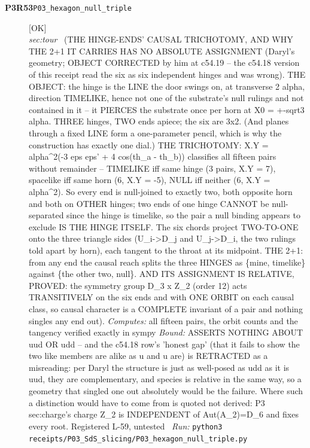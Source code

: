 \begin{description}
\item[\textbf{P3R53}\quad\texttt{P03\_hexagon\_null\_triple}]\hfill\textsf{[OK]}\\
\textit{sec:tour} \ (THE HINGE-ENDS' CAUSAL TRICHOTOMY, AND WHY THE 2+1 IT CARRIES HAS NO ABSOLUTE ASSIGNMENT (Daryl's geometry; OBJECT CORRECTED by him at c54.19 -- the c54.18 version of this receipt read the six as six independent hinges and was wrong). THE OBJECT: the hinge is the LINE the door swings on, at transverse 2 alpha, direction TIMELIKE, hence not one of the substrate's null rulings and not contained in it -- it PIERCES the substrate once per horn at X0 = +-sqrt3 alpha. THREE hinges, TWO ends apiece; the six are 3x2. (And planes through a fixed LINE form a one-parameter pencil, which is why the construction has exactly one dial.) THE TRICHOTOMY: X.Y = alpha\textasciicircum{}2(-3 eps eps' + 4 cos(th\_a - th\_b)) classifies all fifteen pairs without remainder -- TIMELIKE iff same hinge (3 pairs, X.Y = 7), spacelike iff same horn (6, X.Y = -5), NULL iff neither (6, X.Y = alpha\textasciicircum{}2). So every end is null-joined to exactly two, both opposite horn and both on OTHER hinges; two ends of one hinge CANNOT be null-separated since the hinge is timelike, so the pair a null binding appears to exclude IS THE HINGE ITSELF. The six chords project TWO-TO-ONE onto the three triangle sides (U\_i->D\_j and U\_j->D\_i, the two rulings told apart by horn), each tangent to the throat at its midpoint. THE 2+1: from any end the causal reach splits the three HINGES as \{mine, timelike\} against \{the other two, null\}. AND ITS ASSIGNMENT IS RELATIVE, PROVED: the symmetry group D\_3 x Z\_2 (order 12) acts TRANSITIVELY on the six ends and with ONE ORBIT on each causal class, so causal character is a COMPLETE invariant of a pair and nothing singles any end out). 
\emph{Computes:} all fifteen pairs, the orbit counts and the tangency verified exactly in sympy
 \emph{Bound:} ASSERTS NOTHING ABOUT uud OR udd -- and the c54.18 row's 'honest gap' (that it fails to show the two like members are alike as u and u are) is RETRACTED as a misreading: per Daryl the structure is just as well-posed as udd as it is uud, they are complementary, and species is relative in the same way, so a geometry that singled one out absolutely would be the failure. Where such a distinction would have to come from is quoted not derived: P3 sec:charge's charge Z\_2 is INDEPENDENT of Aut(A\_2)=D\_6 and fixes every root. Registered L-59, untested
\ \emph{Run:} \texttt{python3 receipts/P03\_SdS\_slicing/P03\_hexagon\_null\_triple.py}

\end{description}
